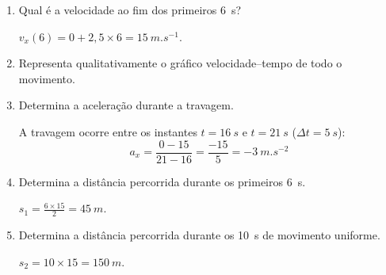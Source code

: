 \documentclass[11pt,a4paper]{article}
\begin{document}
	\begin{enumerate}[label=\textbf{\arabic*.},resume]
		
		\item Qual é a velocidade ao fim dos primeiros \SI{6}{s}?
		
		\begin{solucao}
			$v_x(6) = 0 + 2,5 \times 6 = \SI{15}{m.s^{-1}}$.
		\end{solucao}
		
		\item Representa qualitativamente o gráfico velocidade--tempo de todo o
		movimento.
		
		\begin{solucao}
			\begin{center}
			\end{center}
		\end{solucao}
		
		\item Determina a aceleração durante a travagem.
		
		\begin{solucao}
			A travagem ocorre entre os instantes $t = \SI{16}{s}$ e $t = \SI{21}{s}$ ($\Delta t = \SI{5}{s}$):
			\[
			a_x = \frac{0 - 15}{21 - 16} = \frac{-15}{5} = \SI{-3}{m.s^{-2}}
			\]
		\end{solucao}
		
		\item Determina a distância percorrida durante os primeiros \SI{6}{s}.
		
		\begin{solucao}
			$s_1 = \frac{6 \times 15}{2} = \SI{45}{m}$.
		\end{solucao}
		
		\item Determina a distância percorrida durante os \SI{10}{s} de movimento
		uniforme.
		
		\begin{solucao}
			$s_2 = 10 \times 15 = \SI{150}{m}$.
		\end{solucao}
		

\end{enumerate}
\end{document}
